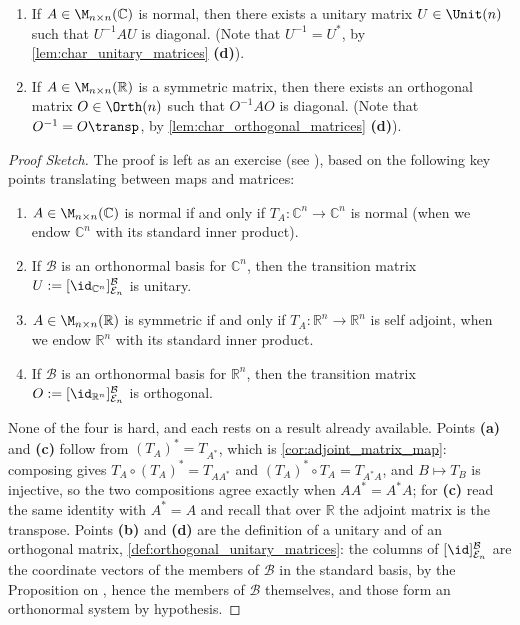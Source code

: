 \begin{theorem}
\label{thm:spectral_thm_matrices}
\begin{enumerate}[label=\textbf{(\alph*)}]
    \item If $A \in \M_{n \times n}(\mathbb{C})$ is normal, then there exists a unitary matrix $U \in \Unit(n)$ such that $U^{-1} A U$ is diagonal. (Note that $U^{-1} = U^*$, by \cref{lem:char_unitary_matrices} \textbf{(d)}).
    \item If $A \in \M_{n \times n}(\mathbb{R})$ is a symmetric matrix, then there exists an orthogonal matrix $O \in \Orth(n)$ such that $O^{-1} A O$ is diagonal. (Note that $O^{-1} = O\transp$, by \cref{lem:char_orthogonal_matrices} \textbf{(d)}).
\end{enumerate}
\end{theorem}

\begin{proof}[Proof Sketch]
The proof is left as an exercise (see ), based on the following key points translating between maps and matrices:
\begin{enumerate}[label=\textbf{(\alph*)}]
    \item $A \in \M_{n \times n}(\mathbb{C})$ is normal if and only if $T_A \colon \mathbb{C}^n \to \mathbb{C}^n$ is normal (when we endow $\mathbb{C}^n$ with its standard inner product).
    \item If $\mathcal{B}$ is an orthonormal basis for $\mathbb{C}^n$, then the transition matrix $U := [\id_{\mathbb{C}^n}]_{\mathcal{E}_n}^{\mathcal{B}}$ is unitary.
    \item $A \in \M_{n \times n}(\mathbb{R})$ is symmetric if and only if $T_A \colon \mathbb{R}^n \to \mathbb{R}^n$ is self adjoint, when we endow $\mathbb{R}^n$ with its standard inner product.
    \item If $\mathcal{B}$ is an orthonormal basis for $\mathbb{R}^n$, then the transition matrix $O := [\id_{\mathbb{R}^n}]_{\mathcal{E}_n}^{\mathcal{B}}$ is orthogonal.
\end{enumerate}
None of the four is hard, and each rests on a result already available. Points \textbf{(a)} and \textbf{(c)} follow from $(T_A)^* = T_{A^*}$, which is \cref{cor:adjoint_matrix_map}: composing gives $T_A \circ (T_A)^* = T_{A A^*}$ and $(T_A)^* \circ T_A = T_{A^* A}$, and $B \mapsto T_B$ is injective, so the two compositions agree exactly when $A A^* = A^* A$; for \textbf{(c)} read the same identity with $A^* = A$ and recall that over $\mathbb{R}$ the adjoint matrix is the transpose. Points \textbf{(b)} and \textbf{(d)} are the definition of a unitary and of an orthogonal matrix, \cref{def:orthogonal_unitary_matrices}: the columns of $[\id]_{\mathcal{E}_n}^{\mathcal{B}}$ are the coordinate vectors of the members of $\mathcal{B}$ in the standard basis, by the Proposition on , hence the members of $\mathcal{B}$ themselves, and those form an orthonormal system by hypothesis.
\end{proof}

